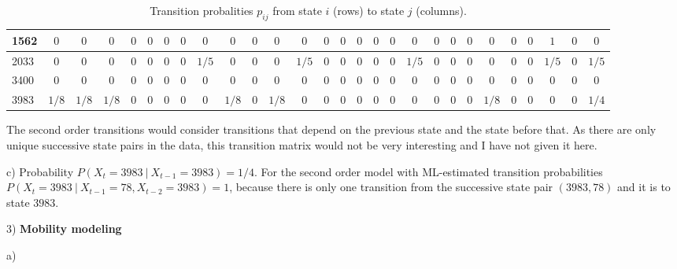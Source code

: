 \documentclass[a4paper,parskip=full]{scrartcl}
\begin{document}
\begin{table}[ht!]
{\begin{tabular}{| l | c | c | c | c | c | c | c | c | c | c | c | c | c | c | c | c | c | c | c | c | c | c | c | c | c | c | c |}
1562 & $0$ & $0$ & $0$ & $0$ & $0$ & $0$ & $0$ & $0$ & $0$ & $0$ & $0$ & $0$ & $0$ & $0$ & $0$ & $0$ & $0$ & $0$ & $0$ & $0$ & $0$ & $0$ & $0$ & $0$ & $1$ & $0$ & $0$\\ \hline
2033 & $0$ & $0$ & $0$ & $0$ & $0$ & $0$ & $0$ & $1/5$ & $0$ & $0$ & $0$ & $1/5$ & $0$ & $0$ & $0$ & $0$ & $0$ & $1/5$ & $0$ & $0$ & $0$ & $0$ & $0$ & $0$ & $1/5$ & $0$ & $1/5$\\ \hline
3400 & $0$ & $0$ & $0$ & $0$ & $0$ & $0$ & $0$ & $0$ & $0$ & $0$ & $0$ & $0$ & $0$ & $0$ & $0$ & $0$ & $0$ & $0$ & $0$ & $0$ & $0$ & $0$ & $0$ & $0$ & $0$ & $0$ & $0$\\ \hline
3983 & $1/8$ & $1/8$ & $1/8$ & $0$ & $0$ & $0$ & $0$ & $0$ & $1/8$ & $0$ & $1/8$ & $0$ & $0$ & $0$ & $0$ & $0$ & $0$ & $0$ & $0$ & $0$ & $0$ & $1/8$ & $0$ & $0$ & $0$ & $0$ & $1/4$\\ \hline
\end{tabular}
}
\caption{Transition probalities $p_{ij}$ from state $i$ (rows) to state $j$
(columns). }
\label{table1}
\end{table}

  The second order transitions would consider transitions that depend on
  the previous state and the state before that. As there are only unique
  successive state pairs in the data, this transition matrix would not be
  very interesting and I have not given it here.

  c) Probability $P(X_t = 3983 \ | \ X_{t-1} = 3983) = 1/4$. For the second order
  model with ML-estimated transition probabilities
  $P(X_t = 3983 \ | \ X_{t-1} = 78, X_{t-2} = 3983) = 1$, because there is only
  one transition from the successive state pair $(3983, 78)$ and it is to
  state $3983$.

3) \textbf{Mobility modeling}

  a)
\end{document}
